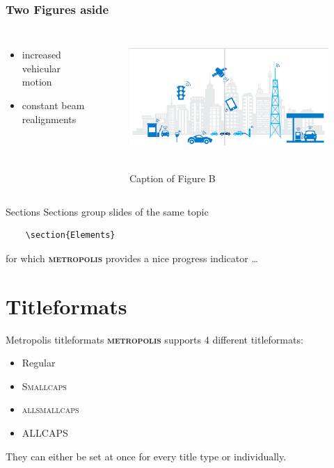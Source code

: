 \documentclass[10pt]{beamer}
\newcommand{\themename}{\textbf{\textsc{metropolis}}\xspace}
\begin{document}
\begin{frame}
	\frametitle{Two Figures aside}
	\begin{columns}[b]
			\begin{itemize}[<+- | alert@+>]
			\item increased vehicular motion
			\item constant beam realignments
			\end{itemize}
			
			\centering
			\begin{figure}
				\includegraphics[width=\textwidth]{src/futureits.png} \
				\caption{Caption of Figure B}
			\end{figure}
	\end{columns}
\end{frame}


\begin{frame}[fragile]{Sections}
  Sections group slides of the same topic

  \begin{verbatim}    \section{Elements}\end{verbatim}

  for which \themename provides a nice progress indicator \ldots
\end{frame}

\section{Titleformats}

\begin{frame}{Metropolis titleformats}
	\themename supports 4 different titleformats:
	\begin{itemize}
		\item Regular
		\item \textsc{Smallcaps}
		\item \textsc{allsmallcaps}
		\item ALLCAPS
	\end{itemize}
	They can either be set at once for every title type or individually.
\end{frame}
\end{document}
